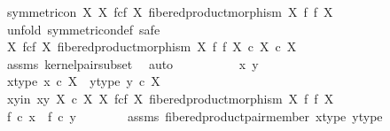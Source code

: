 \begin{isabellebody}
\ {\isachardoublequoteopen}symmetric{\isacharunderscore}{\kern0pt}on\ X\ {\isacharparenleft}{\kern0pt}X\ \isactrlbsub f\isactrlesub {\isasymtimes}\isactrlsub c\isactrlbsub f\isactrlesub \ X{\isacharcomma}{\kern0pt}\ fibered{\isacharunderscore}{\kern0pt}product{\isacharunderscore}{\kern0pt}morphism\ X\ f\ f\ X{\isacharparenright}{\kern0pt}{\isachardoublequoteclose}\isanewline
\ \ \isamarkupfalse%
\ {\isacharparenleft}{\kern0pt}unfold\ symmetric{\isacharunderscore}{\kern0pt}on{\isacharunderscore}{\kern0pt}def{\isacharcomma}{\kern0pt}\ safe{\isacharparenright}{\kern0pt}\isanewline
\ \ \ \ \isamarkupfalse%
\ {\isachardoublequoteopen}{\isacharparenleft}{\kern0pt}X\ \isactrlbsub f\isactrlesub {\isasymtimes}\isactrlsub c\isactrlbsub f\isactrlesub \ X{\isacharcomma}{\kern0pt}\ fibered{\isacharunderscore}{\kern0pt}product{\isacharunderscore}{\kern0pt}morphism\ X\ f\ f\ X{\isacharparenright}{\kern0pt}\ {\isasymsubseteq}\isactrlsub c\ X\ {\isasymtimes}\isactrlsub c\ X{\isachardoublequoteclose}\isanewline
\ \ \ \ \ \ \isamarkupfalse%
\ assms\ kernel{\isacharunderscore}{\kern0pt}pair{\isacharunderscore}{\kern0pt}subset\ \isamarkupfalse%
\ auto\isanewline
\ \ \isamarkupfalse%
\ \isanewline
\ \ \ \ \isamarkupfalse%
\ x\ y\isanewline
\ \ \ \ \isamarkupfalse%
\ x{\isacharunderscore}{\kern0pt}type{\isacharcolon}{\kern0pt}\ {\isachardoublequoteopen}x\ {\isasymin}\isactrlsub c\ X{\isachardoublequoteclose}\ \ y{\isacharunderscore}{\kern0pt}type{\isacharcolon}{\kern0pt}\ {\isachardoublequoteopen}y\ {\isasymin}\isactrlsub c\ X{\isachardoublequoteclose}\isanewline
\ \ \ \ \isamarkupfalse%
\ xy{\isacharunderscore}{\kern0pt}in{\isacharcolon}{\kern0pt}\ {\isachardoublequoteopen}{\isasymlangle}x{\isacharcomma}{\kern0pt}y{\isasymrangle}\ {\isasymin}\isactrlbsub X\ {\isasymtimes}\isactrlsub c\ X\isactrlesub \ {\isacharparenleft}{\kern0pt}X\ \isactrlbsub f\isactrlesub {\isasymtimes}\isactrlsub c\isactrlbsub f\isactrlesub \ X{\isacharcomma}{\kern0pt}\ fibered{\isacharunderscore}{\kern0pt}product{\isacharunderscore}{\kern0pt}morphism\ X\ f\ f\ X{\isacharparenright}{\kern0pt}{\isachardoublequoteclose}\isanewline
\ \ \ \ \isamarkupfalse%
\ \isamarkupfalse%
\ {\isachardoublequoteopen}f\ {\isasymcirc}\isactrlsub c\ x\ {\isacharequal}{\kern0pt}\ f\ {\isasymcirc}\isactrlsub c\ y{\isachardoublequoteclose}\isanewline
\ \ \ \ \ \ \isamarkupfalse%
\ assms\ fibered{\isacharunderscore}{\kern0pt}product{\isacharunderscore}{\kern0pt}pair{\isacharunderscore}{\kern0pt}member\ x{\isacharunderscore}{\kern0pt}type\ y{\isacharunderscore}{\kern0pt}type\ \isamarkupfalse%

\end{isabellebody}
